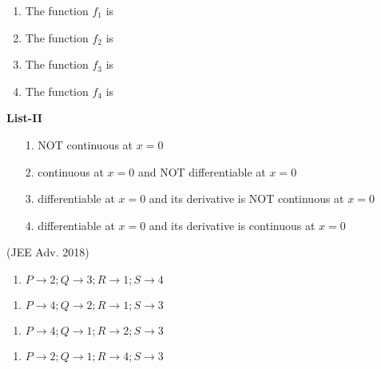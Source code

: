\documentclass[journal,12pt,twocolumn]{IEEEtran}
\theoremstyle{remark}
\begin{document}
\begin{enumerate}
\begin{multicols}{2}
				\begin{enumerate}[label=\Alph*., start=16]
					\item The function $f_1$ is
					\item The function $f_2$ is 
					\item The function $f_3$ is 
					\item The function $f_4$ is
				\end{enumerate}
				\columnbreak
				\textbf{List-II}
				\begin{enumerate}
					\item[1.]  NOT continuous at $x = 0$ 
					\item[2.]  continuous at $x = 0$ and NOT differentiable at $x = 0$
					\item[3.] differentiable at $x = 0$ and its derivative is NOT continuous at $x = 0$
					\item[4.] differentiable at $x = 0$ and its derivative is continuous at $x = 0$
				\end{enumerate}
                 \hfill(JEE Adv. 2018)
		\end{multicols}
            \begin{multicols}{2}
			\begin{enumerate}
				\item $P\rightarrow2;Q\rightarrow3;R\rightarrow1;S\rightarrow4$
			\end{enumerate}
			\begin{enumerate}
				\item $P\rightarrow4;Q\rightarrow2;R\rightarrow1;S\rightarrow3$
			\end{enumerate}
			\columnbreak
			\begin{enumerate}
				\item $P\rightarrow4;Q\rightarrow1;R\rightarrow2;S\rightarrow3$
			\end{enumerate}
			\begin{enumerate}
				\item $P\rightarrow2;Q\rightarrow1;R\rightarrow4;S\rightarrow3$
			\end{enumerate}
		\end{multicols}
\end{enumerate}
\end{document}
